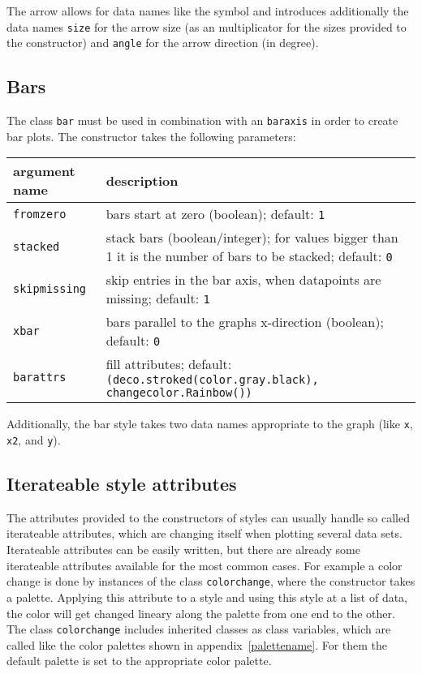 The arrow allows for data names like the symbol and introduces
additionally the data names \verb|size| for the arrow size (as an
multiplicator for the sizes provided to the constructor) and
\verb|angle| for the arrow direction (in degree).

\subsection{Bars}

The class \verb|bar| must be used in combination with an
\verb|baraxis| in order to create bar plots. The constructor takes the
following parameters:

\medskip
\begin{tabularx}{\linewidth}{l>{\raggedright\arraybackslash}X}
argument name&description\\
\hline
\texttt{fromzero}&bars start at zero (boolean); default: \texttt{1}\\
\texttt{stacked}&stack bars (boolean/integer); for values bigger than 1 it is the number of bars to be stacked; default: \texttt{0}\\
\texttt{skipmissing}&skip entries in the bar axis, when datapoints are missing; default: \texttt{1}\\
\texttt{xbar}&bars parallel to the graphs x-direction (boolean); default: \texttt{0}\\
\texttt{barattrs}&fill attributes; default: \texttt{(deco.stroked(color.gray.black), changecolor.Rainbow())}\\
\end{tabularx}

Additionally, the bar style takes two data names appropriate to the
graph (like \verb|x|, \verb|x2|, and \verb|y|).

\subsection{Iterateable style attributes}
\label{graph:changeattrs}

The attributes provided to the constructors of styles can usually
handle so called iterateable attributes, which are changing itself
when plotting several data sets. Iterateable attributes can be easily
written, but there are already some iterateable attributes available
for the most common cases. For example a color change is done by
instances of the class \verb|colorchange|, where the constructor takes
a palette. Applying this attribute to a style and using this style at
a list of data, the color will get changed lineary along the
palette from one end to the other. The class \verb|colorchange|
includes inherited classes as class variables, which are called like
the color palettes shown in appendix~\ref{palettename}. For them the
default palette is set to the appropriate color palette.

